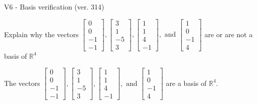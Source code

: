 \begin{exercise}
  \begin{exerciseTitle}V6 - Basis verification (ver. 314)\end{exerciseTitle}
  \begin{exerciseStatement}
    Explain why the vectors \(\left[\begin{array}{r}
0 \\
0 \\
-1 \\
-1
\end{array}\right] , \left[\begin{array}{r}
3 \\
1 \\
-5 \\
3
\end{array}\right] , \left[\begin{array}{r}
1 \\
1 \\
4 \\
-1
\end{array}\right] , \text{ and } \left[\begin{array}{r}
1 \\
0 \\
-1 \\
4
\end{array}\right]\) are or are not a basis of \(\mathbb{R}^4\)	


  \end{exerciseStatement}
  \begin{exerciseAnswer}
   The vectors \(\left[\begin{array}{r}
0 \\
0 \\
-1 \\
-1
\end{array}\right] , \left[\begin{array}{r}
3 \\
1 \\
-5 \\
3
\end{array}\right] , \left[\begin{array}{r}
1 \\
1 \\
4 \\
-1
\end{array}\right] , \text{ and } \left[\begin{array}{r}
1 \\
0 \\
-1 \\
4
\end{array}\right]\) 
  	 are  a basis of \(\mathbb{R}^4\).
  


  \end{exerciseAnswer}
\end{exercise}